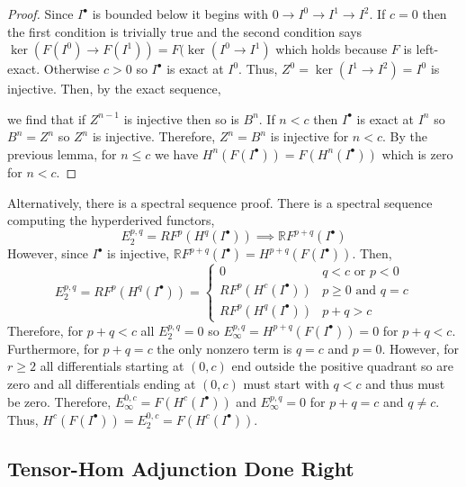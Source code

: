 \documentclass[12pt]{article}
\begin{document}
\begin{proof}
Since $I^\bullet$ is bounded below it begins with $0 \to I^0 \to I^1 \to I^2$. If $c = 0$ then the first condition is trivially true and the second condition says $\ker{(F(I^0) \to F(I^1))} = F(\ker{(I^0 \to I^1)}$ which holds because $F$ is left-exact. Otherwise $ c > 0$  so $I^\bullet$ is exact at $I^0$. Thus, $Z^0 = \ker{(I^1 \to I^2)} = I^0$ is injective. Then, by the exact sequence,
\begin{center}
\end{center}
we find that if $Z^{n-1}$ is injective then so is $B^{n}$. If $n < c$ then $I^\bullet$ is exact at $I^{n}$ so $B^{n} = Z^{n}$ so $Z^{n}$ is injective. Therefore, $Z^n = B^n$ is injective for $n < c$. By the previous lemma, for $n \le c$ we have $H^n(F(I^\bullet)) = F(H^n(I^\bullet))$ which is zero for $n < c$.
\end{proof}

\begin{rmk}
Alternatively, there is a spectral sequence proof. There is a spectral sequence computing the hyperderived functors,
\[ E^{p,q}_2 = R F^p(H^q(I^\bullet)) \implies \mathbb{R} F^{p + q}(I^\bullet) \]
However, since $I^\bullet$ is injective, $\mathbb{R} F^{p + q}(I^\bullet) = H^{p + q}(F(I^\bullet))$. Then,
\[ E^{p, q}_2 = R F^p(H^q(I^\bullet)) = 
\begin{cases}
0 & q < c \text{ or } p < 0
\\
R F^p(H^c(I^\bullet)) & p \ge 0 \text{ and } q = c
\\
R F^p(H^q(I^\bullet)) & p + q > c
\end{cases} \]
Therefore, for $p + q < c$ all $E^{p,q}_2 = 0$ so $E^{p,q}_\infty = H^{p+q}(F(I^\bullet)) = 0$ for $p + q < c$. Furthermore, for $p + q = c$ the only nonzero term is $q = c$ and $p = 0$. However, for $r \ge 2$ all differentials starting at $(0, c)$ end outside the positive quadrant so are zero and all differentials ending at $(0, c)$ must start with $q < c$ and thus must be zero. Therefore, $E^{0,c}_{\infty} = F(H^c(I^\bullet))$ and $E^{p, q}_{\infty} = 0$ for $p + q = c$ and $q \neq c$. Thus, $H^c(F(I^\bullet)) = E^{0,c}_2 = F(H^c(I^\bullet))$. 
\end{rmk}

\subsection{Tensor-Hom Adjunction Done Right}
\end{document}
